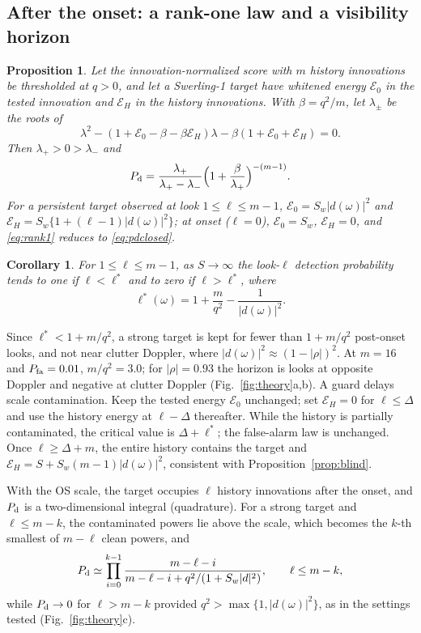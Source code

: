 \documentclass[journal]{IEEEtran}
\newtheorem{proposition}{Proposition}
\newtheorem{corollary}{Corollary}
\begin{document}
\subsection{After the onset: a rank-one law and a visibility horizon}
\begin{proposition}\label{prop:rank1}
Let the innovation-normalized score with $m$ history innovations be thresholded at $q>0$, and let a Swerling-1 target have whitened energy $\mathcal E_0$ in the tested innovation and $\mathcal E_H$ in the history innovations. With $\beta=q^2/m$, let $\lambda_\pm$ be the roots of
\[
\lambda^2-(1+\mathcal E_0-\beta-\beta\mathcal E_H)\lambda-\beta(1+\mathcal E_0+\mathcal E_H)=0 .
\]
Then $\lambda_+>0>\lambda_-$ and
\begin{equation}
P_{\rm d}=\frac{\lambda_+}{\lambda_+-\lambda_-}\Big(1+\frac{\beta}{\lambda_+}\Big)^{-(m-1)}.
\label{eq:rank1}
\end{equation}
For a persistent target observed at look $1\le\ell\le m-1$, $\mathcal E_0=S_w|d(\omega)|^2$ and $\mathcal E_H=S_w\{1+(\ell-1)|d(\omega)|^2\}$; at onset ($\ell=0$), $\mathcal E_0=S_w$, $\mathcal E_H=0$, and \eqref{eq:rank1} reduces to \eqref{eq:pdclosed}.
\end{proposition}
\begin{corollary}\label{cor:horizon}
For $1\le\ell\le m-1$, as $S\to\infty$ the look-$\ell$ detection probability tends to one if $\ell<\ell^*$ and to zero if $\ell>\ell^*$, where
\begin{equation}
\ell^*(\omega)=1+\frac{m}{q^2}-\frac{1}{|d(\omega)|^2}.
\label{eq:horizon}
\end{equation}
\end{corollary}
Since $\ell^*<1+m/q^2$, a strong target is kept for fewer than $1+m/q^2$ post-onset looks, and not near clutter Doppler, where $|d(\omega)|^2\approx(1-|\rho|)^2$. At $m=16$ and $P_{\rm fa}=0.01$, $m/q^2=3.0$; for $|\rho|=0.93$ the horizon is \ThHorizonOpp{} looks at opposite Doppler and negative at clutter Doppler (Fig.~\ref{fig:theory}a,b). A guard delays scale contamination. Keep the tested energy $\mathcal E_0$ unchanged; set $\mathcal E_H=0$ for $\ell\le\Delta$ and use the history energy at $\ell-\Delta$ thereafter. While the history is partially contaminated, the critical value is $\Delta+\ell^*$; the false-alarm law is unchanged. Once $\ell\ge\Delta+m$, the entire history contains the target and $\mathcal E_H=S+S_w(m-1)|d(\omega)|^2$, consistent with Proposition~\ref{prop:blind}.

With the OS scale, the target occupies $\ell$ history innovations after the onset, and $P_{\rm d}$ is a two-dimensional integral (quadrature). For a strong target and $\ell\le m-k$, the contaminated powers lie above the scale, which becomes the $k$-th smallest of $m-\ell$ clean powers, and
\begin{equation}
P_{\rm d}\simeq\prod_{i=0}^{k-1}\frac{m-\ell-i}{m-\ell-i+q^2/(1+S_w|d|^2)},\qquad \ell\le m-k,
\label{eq:osstrong}
\end{equation}
while $P_{\rm d}\to0$ for $\ell>m-k$ provided $q^2>\max\{1,|d(\omega)|^2\}$, as in the settings tested (Fig.~\ref{fig:theory}c).
\end{document}
